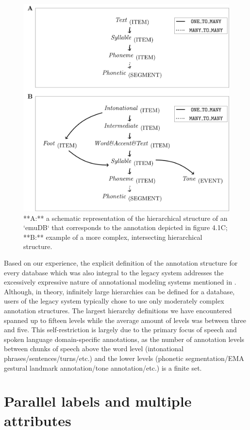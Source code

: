 \documentclass[]{book}
\begin{document}
\begin{figure}

{\centering \includegraphics[width=0.75\linewidth]{pics/annotStruct} 

}

\caption{**A:** a schematic representation of the hierarchical structure of an `emuDB` that corresponds to the annotation depicted in figure 4.1C; **B:** example of a more complex, intersecting hierarchical structure.}\label{fig:annotStruct}
\end{figure}

Based on our experience, the explicit definition of the annotation structure for every database which was also integral to the legacy system addresses the excessively expressive nature of annotational modeling systems mentioned in \citet{bird:sc2001a}. Although, in theory, infinitely large hierarchies can be defined for a database, users of the legacy system typically chose to use only moderately complex annotation structures. The largest hierarchy definitions we have encountered spanned up to fifteen levels while the average amount of levels was between three and five. This self-restriction is largely due to the primary focus of speech and spoken language domain-specific annotations, as the number of annotation levels between chunks of speech above the word level (intonational phrases/sentences/turns/etc.) and the lower levels (phonetic segmentation/EMA gestural landmark annotation/tone annotation/etc.) is a finite set.

\hypertarget{parallel-labels-and-multiple-attributes}{%
\section{Parallel labels and multiple attributes}\label{parallel-labels-and-multiple-attributes}}
\end{document}
